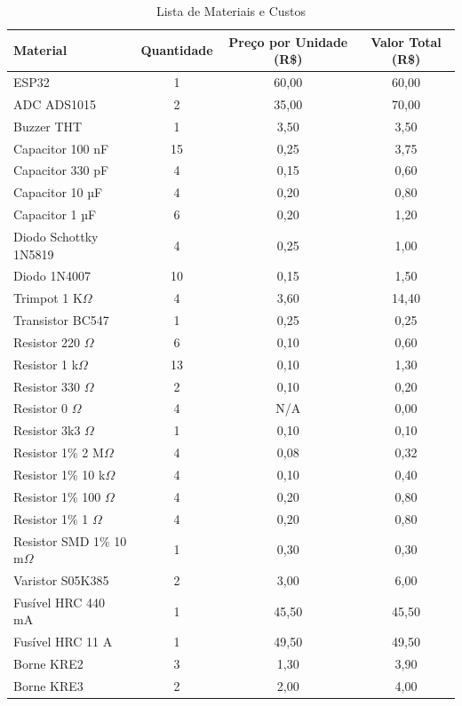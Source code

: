\begin{table}[h!]
\centering
\caption{Lista de Materiais e Custos}
\label{tab:Bookofmaterials}
\begin{tabular}{|l|c|c|c|}
\hline
\textbf{Material} & \textbf{Quantidade} & \textbf{Preço por Unidade (R\$)} & \textbf{Valor Total (R\$)} \\ \hline
ESP32 & 1 & 60,00 & 60,00 \\ \hline
ADC ADS1015 & 2 & 35,00 & 70,00 \\ \hline
Buzzer THT & 1 & 3,50 & 3,50 \\ \hline
Capacitor 100 nF & 15 & 0,25 & 3,75 \\ \hline
Capacitor 330 pF & 4 & 0,15 & 0,60 \\ \hline
Capacitor 10 µF & 4 & 0,20 & 0,80 \\ \hline
Capacitor 1 µF & 6 & 0,20 & 1,20 \\ \hline
Diodo Schottky 1N5819 & 4 & 0,25 & 1,00 \\ \hline
Diodo 1N4007 & 10 & 0,15 & 1,50 \\ \hline
Trimpot 1 K$\Omega$ & 4 & 3,60 & 14,40 \\ \hline
Transistor BC547 & 1 & 0,25 & 0,25 \\ \hline
Resistor 220 $\Omega$ & 6 & 0,10 & 0,60 \\ \hline
Resistor 1 k$\Omega$ & 13 & 0,10 & 1,30 \\ \hline
Resistor 330 $\Omega$ & 2 & 0,10 & 0,20 \\ \hline
Resistor 0 $\Omega$ & 4 & N/A & 0,00 \\ \hline
Resistor 3k3 $\Omega$ & 1 & 0,10 & 0,10 \\ \hline
Resistor 1\% 2 M$\Omega$ & 4 & 0,08 & 0,32 \\ \hline
Resistor 1\% 10 k$\Omega$ & 4 & 0,10 & 0,40 \\ \hline
Resistor 1\% 100 $\Omega$ & 4 & 0,20 & 0,80 \\ \hline
Resistor 1\% 1 $\Omega$ & 4 & 0,20 & 0,80 \\ \hline
Resistor SMD 1\% 10 m$\Omega$ & 1 & 0,30 & 0,30 \\ \hline
Varistor S05K385 & 2 & 3,00 & 6,00 \\ \hline
Fusível HRC 440 mA & 1 & 45,50 & 45,50 \\ \hline
Fusível HRC 11 A & 1 & 49,50 & 49,50 \\ \hline
Borne KRE2 & 3 & 1,30 & 3,90 \\ \hline
Borne KRE3 & 2 & 2,00 & 4,00 \\ \hline

\end{tabular}
\end{table}
